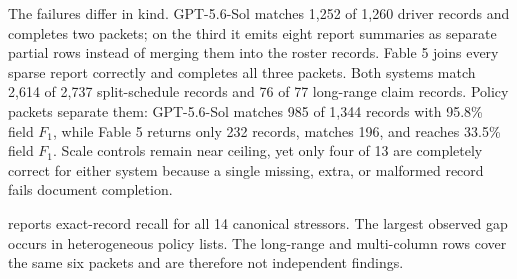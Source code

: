 The failures differ in kind. GPT-5.6-Sol matches 1{,}252 of 1{,}260 driver records and completes two packets; on the third it emits eight report summaries as separate partial rows instead of merging them into the roster records. Fable 5 joins every sparse report correctly and completes all three packets. Both systems match 2{,}614 of 2{,}737 split-schedule records and 76 of 77 long-range claim records. Policy packets separate them: GPT-5.6-Sol matches 985 of 1{,}344 records with 95.8\% field $F_1$, while Fable 5 returns only 232 records, matches 196, and reaches 33.5\% field $F_1$. Scale controls remain near ceiling, yet only four of 13 are completely correct for either system because a single missing, extra, or malformed record fails document completion.

 reports exact-record recall for all 14 canonical stressors. The largest observed gap occurs in heterogeneous policy lists. The long-range and multi-column rows cover the same six packets and are therefore not independent findings.

